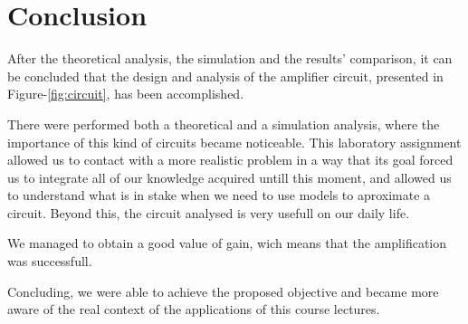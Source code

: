 \section{Conclusion}
\label{sec:conclusion}

After the theoretical analysis, the simulation and the results' comparison, it can be
concluded that the design and analysis of the amplifier circuit, presented in Figure-\ref{fig:circuit}, has been accomplished.\par

There were performed both a theoretical and a simulation analysis, where the importance of this kind of circuits became noticeable. This laboratory assignment allowed us to contact with a more realistic problem in a way that its goal forced us to integrate all of our knowledge acquired untill this moment, and allowed us to understand what is in stake when we need to use models to aproximate a circuit. Beyond this, the circuit analysed is very usefull on our daily life.\par
We managed to obtain a good value of gain, wich means that the amplification was successfull.\par
Concluding, we were able to achieve the proposed objective and became more aware of the real context of the applications of this course lectures.
